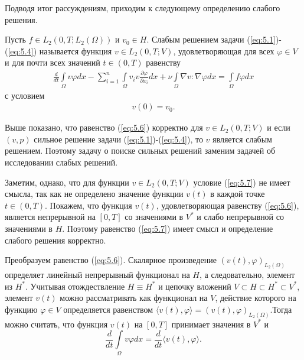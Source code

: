 Подводя итог рассуждениям, приходим к следующему определению слабого решения.
\begin{definition}
    Пусть $f\in L_2(0,T;L_2(\Omega))$ и $v_0\in H$. Слабым решением задачи (\ref{eq:5.1})-(\ref{eq:5.4}) называется функция $v\in L_2(0, T;V)$,
    удовлетворяющая для всех $\varphi \in V$ и для почти всех значений $t \in (0, T)$ равенству
    \begin{equation}\label{eq:5.6}
        \begin{gathered}
            \frac{d}{dt}\int\limits_\Omega v \varphi dx-\sum_{i=1}^{n}\int\limits_\Omega v_i v
            \frac{\partial \varphi }{\partial x_i}dx + \nu\int\limits_\Omega \nabla v :\nabla\varphi dx=
            \int\limits_\Omega f \varphi dx
        \end{gathered}
    \end{equation}
    с условием
    \begin{equation}\label{eq:5.7}
        \begin{gathered}
            v(0) = v_0.
        \end{gathered}
    \end{equation}
\end{definition}

Выше показано, что равенство (\ref{eq:5.6}) корректно для $v \in L_2(0, T; V)$ и если $(v, p)$ сильное решение задачи (\ref{eq:5.1})-(\ref{eq:5.4}),
то $v$ является слабым решением. Поэтому задачу о поиске сильных решений заменим задачей об исследовании слабых решений.

Заметим, однако, что для функции $v \in L_2(0, T; V)$ условие (\ref{eq:5.7}) не имеет смысла, так как не определено значение функции $v(t)$ в каждой точке
$t \in (0, T)$. Покажем, что функция $v(t)$, удовлетворяющая равенству (\ref{eq:5.6}), является непрерывной на $[0, T]$ со значениями в $V^\ast$ и слабо
непрерывной со значениями в $H$. Поэтому равенство (\ref{eq:5.7}) имеет смысл и определение слабого решения корректно.

Преобразуем равенство (\ref{eq:5.6}). Скалярное произведение $(v(t), \varphi)_{L_2(\Omega)}$ определяет линейный непрерывный функционал на $H$, а следовательно,
элемент из $H^\ast$. Учитывая отождествление $H \equiv H^\ast$ и цепочку вложений $V \subset H \subset H^\ast \subset V^\ast$,
элемент $v(t)$ можно рассматривать как функционал на $V$, действие которого на функцию $\varphi \in V$ определяется равенством
$\langle v(t),\varphi \rangle = (v(t),\varphi)_{L_2(\Omega)}$.Тогда можно считать, что функция $v(t)$ на $[0, T]$ принимает значения в $V^\ast$ и
$$\frac{d}{dt}\int\limits_\Omega v \varphi dx=\frac{d}{dt}\langle v(t),\varphi \rangle.$$

